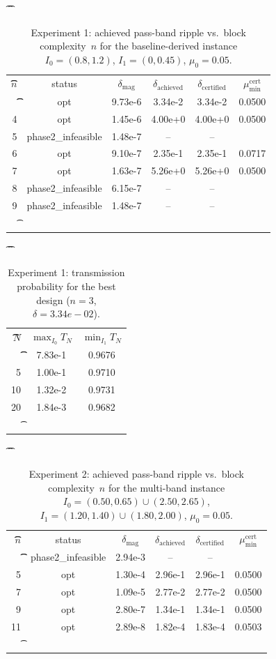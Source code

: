 \begin{table}[ht]
\t\centering
\t\begin{tabular}{r|ccccc}
\t\t$n$ & status & $\delta_{\mathrm{mag}}$ & $\delta_{\mathrm{achieved}}$ & $\delta_{\mathrm{certified}}$ & $\mu_{\min}^{\mathrm{cert}}$ \\
\t\t\hline
		3 & opt & 9.73e-6 & 3.34e-2 & 3.34e-2 & 0.0500 \\
		4 & opt & 1.45e-6 & 4.00e+0 & 4.00e+0 & 0.0500 \\
		5 & phase2\_infeasible & 1.48e-7 & -- & -- &  \\
		6 & opt & 9.10e-7 & 2.35e-1 & 2.35e-1 & 0.0717 \\
		7 & opt & 1.63e-7 & 5.26e+0 & 5.26e+0 & 0.0500 \\
		8 & phase2\_infeasible & 6.15e-7 & -- & -- &  \\
		9 & phase2\_infeasible & 1.48e-7 & -- & -- &  \\
\t\end{tabular}
	\caption{Experiment 1: achieved pass-band ripple vs.\ block complexity~$n$ for the baseline-derived instance $I_0=(0.8,1.2)$, $I_1=(0,0.45)$, $\mu_0=0.05$.}\label{tab:exp1-degree-scan}
\end{table}

\begin{table}[ht]
\t\centering
\t\begin{tabular}{r|cc}
\t\t$N$ & $\max_{I_0}T_N$ & $\min_{I_1}T_N$ \\
\t\t\hline
		1 & 7.83e-1 & 0.9676 \\
		5 & 1.00e-1 & 0.9710 \\
		10 & 1.32e-2 & 0.9731 \\
		20 & 1.84e-3 & 0.9682 \\
\t\end{tabular}
	\caption{Experiment 1: transmission probability for the best design ($n=3$, $\delta=3.34e-02$).}\label{tab:exp1-TN}
\end{table}

\begin{table}[ht]
\t\centering
\t\begin{tabular}{r|ccccc}
\t\t$n$ & status & $\delta_{\mathrm{mag}}$ & $\delta_{\mathrm{achieved}}$ & $\delta_{\mathrm{certified}}$ & $\mu_{\min}^{\mathrm{cert}}$ \\
\t\t\hline
		3 & phase2\_infeasible & 2.94e-3 & -- & -- &  \\
		5 & opt & 1.30e-4 & 2.96e-1 & 2.96e-1 & 0.0500 \\
		7 & opt & 1.09e-5 & 2.77e-2 & 2.77e-2 & 0.0500 \\
		9 & opt & 2.80e-7 & 1.34e-1 & 1.34e-1 & 0.0500 \\
		11 & opt & 2.89e-8 & 1.82e-4 & 1.83e-4 & 0.0503 \\
\t\end{tabular}
	\caption{Experiment 2: achieved pass-band ripple vs.\ block complexity~$n$ for the multi-band instance $I_0=(0.50,0.65)\cup(2.50,2.65)$, $I_1=(1.20,1.40)\cup(1.80,2.00)$, $\mu_0=0.05$.}\label{tab:exp2-degree-scan}
\end{table}

